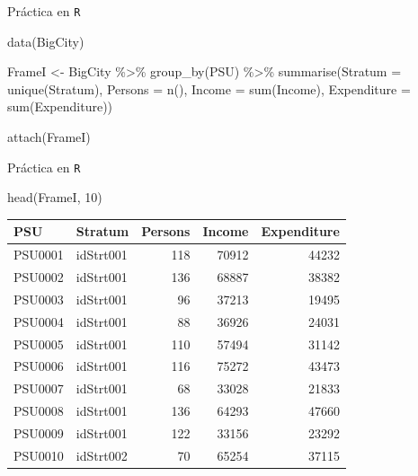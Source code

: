 \documentclass[
  english,
  ignorenonframetext,
]{beamer}
\newenvironment{Shaded}{\begin{snugshade}}{\end{snugshade}}
\newcommand{\AttributeTok}[1]{\textcolor[rgb]{0.77,0.63,0.00}{#1}}
\newcommand{\DecValTok}[1]{\textcolor[rgb]{0.00,0.00,0.81}{#1}}
\newcommand{\FunctionTok}[1]{\textcolor[rgb]{0.00,0.00,0.00}{#1}}
\newcommand{\NormalTok}[1]{#1}
\newcommand{\OtherTok}[1]{\textcolor[rgb]{0.56,0.35,0.01}{#1}}
\newcommand{\SpecialCharTok}[1]{\textcolor[rgb]{0.00,0.00,0.00}{#1}}
\newcommand{\StringTok}[1]{\textcolor[rgb]{0.31,0.60,0.02}{#1}}
\begin{document}
\begin{frame}[fragile]{Práctica en \texttt{R}}
\protect\hypertarget{pruxe1ctica-en-r}{}
\begin{Shaded}
\begin{Highlighting}[]
\FunctionTok{data}\NormalTok{(}\StringTok{\textquotesingle{}BigCity\textquotesingle{}}\NormalTok{)}

\NormalTok{ FrameI }\OtherTok{\textless{}{-}}\NormalTok{ BigCity }\SpecialCharTok{\%\textgreater{}\%} \FunctionTok{group\_by}\NormalTok{(PSU) }\SpecialCharTok{\%\textgreater{}\%}
 \FunctionTok{summarise}\NormalTok{(}\AttributeTok{Stratum =} \FunctionTok{unique}\NormalTok{(Stratum),}
           \AttributeTok{Persons =} \FunctionTok{n}\NormalTok{(),}
           \AttributeTok{Income =} \FunctionTok{sum}\NormalTok{(Income),}
           \AttributeTok{Expenditure =} \FunctionTok{sum}\NormalTok{(Expenditure))}
             
\FunctionTok{attach}\NormalTok{(FrameI)}
\end{Highlighting}
\end{Shaded}
\end{frame}

\begin{frame}[fragile]{Práctica en \texttt{R}}
\protect\hypertarget{pruxe1ctica-en-r-1}{}
\begin{Shaded}
\begin{Highlighting}[]
\FunctionTok{head}\NormalTok{(FrameI, }\DecValTok{10}\NormalTok{)}
\end{Highlighting}
\end{Shaded}

\begin{longtable}[]{@{}llrrr@{}}
\toprule
PSU & Stratum & Persons & Income & Expenditure \\
\midrule
\endhead
PSU0001 & idStrt001 & 118 & 70912 & 44232 \\
PSU0002 & idStrt001 & 136 & 68887 & 38382 \\
PSU0003 & idStrt001 & 96 & 37213 & 19495 \\
PSU0004 & idStrt001 & 88 & 36926 & 24031 \\
PSU0005 & idStrt001 & 110 & 57494 & 31142 \\
PSU0006 & idStrt001 & 116 & 75272 & 43473 \\
PSU0007 & idStrt001 & 68 & 33028 & 21833 \\
PSU0008 & idStrt001 & 136 & 64293 & 47660 \\
PSU0009 & idStrt001 & 122 & 33156 & 23292 \\
PSU0010 & idStrt002 & 70 & 65254 & 37115 \\
\bottomrule
\end{longtable}
\end{frame}
\end{document}
